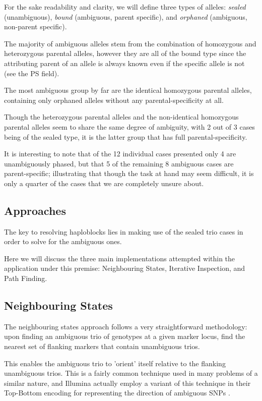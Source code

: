 For the sake readability and clarity, we will define three types of alleles: \textit{sealed} (unambiguous), \textit{bound} (ambiguous, parent specific), and \textit{orphaned} (ambiguous, non-parent specific).

The majority of ambiguous alleles stem from the combination of homozygous and heterozygous parental alleles, however they are all of the bound type since the attributing parent of an allele is always known even if the specific allele is not (see the PS field). 

The most ambiguous group by far are the identical homozygous parental alleles, containing only orphaned alleles without any parental-specificity at all.

Though the heterozygous parental alleles and the non-identical homozygous parental alleles seem to share the same degree of ambiguity, with 2 out of 3 cases being of the sealed type, it is the latter group that has full parental-specificity.

It is interesting to note that of the 12 individual cases presented only 4 are unambiguously phased, but that 5 of the remaining 8 ambiguous cases are parent-specific; illustrating that though the task at hand may seem difficult, it is only a quarter of the cases that we are completely unsure about.


\subsection{Approaches}

The key to resolving haploblocks lies in making use of the sealed trio cases in order to solve for the ambiguous ones. 

Here we will discuss the three main implementations attempted within the application under this premise: Neighbouring States, Iterative Inspection, and Path Finding.

\subsection{Neighbouring States}

The neighbouring states approach follows a very straightforward methodology: upon finding an ambiguous trio of genotypes at a given marker locus, find the nearest set of flanking markers that contain unambiguous trios.

This enables the ambiguous trio to 'orient' itself relative to the flanking unambiguous trios.  This is a fairly common technique used in many problems of a similar nature, and Illumina actually employ a variant of this technique in their Top-Bottom encoding for representing the direction of ambiguous SNPs \cite{illuminatopbot}.

